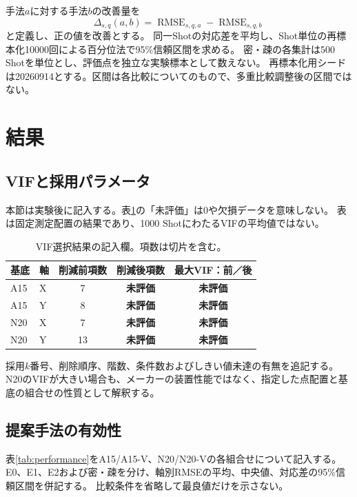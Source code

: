 \documentclass[11pt,a4paper]{ltjsarticle}
\newcommand{\RMSE}{\operatorname{RMSE}}
\newcommand{\todo}{\textbf{未評価}}
\begin{document}
手法$a$に対する手法$b$の改善量を
\begin{equation}
 \Delta_{s,q}(a,b)=\RMSE_{s,q,a}-\RMSE_{s,q,b}
 \label{eq:paired}
\end{equation}
と定義し、正の値を改善とする。
同一Shotの対応差を平均し、Shot単位の再標本化10000回による百分位法で95\%信頼区間を求める。
密・疎の各集計は500 Shotを単位とし、評価点を独立な実験標本として数えない。
再標本化用シードは20260914とする。区間は各比較についてのもので、多重比較調整後の区間ではない。

\section{結果}
\subsection{VIFと採用パラメータ}
本節は実験後に記入する。表\ref{tab:vif-results}の「未評価」は0や欠損データを意味しない。
表は固定測定配置の結果であり、1000 ShotにわたるVIFの平均値ではない。

\begin{table}[htbp]
\centering
\caption{VIF選択結果の記入欄。項数は切片を含む。}
\label{tab:vif-results}
\small
\begin{tabular}{llccc}
\toprule
基底 & 軸 & 削減前項数 & 削減後項数 & 最大VIF：前／後\\
\midrule
A15 & X & 7 & \todo & \todo\\
A15 & Y & 8 & \todo & \todo\\
N20 & X & 7 & \todo & \todo\\
N20 & Y & 13 & \todo & \todo\\
\bottomrule
\end{tabular}
\end{table}
採用$k$番号、削除順序、階数、条件数およびしきい値未達の有無を追記する。
N20のVIFが大きい場合も、メーカーの装置性能ではなく、指定した点配置と基底の組合せの性質として解釈する。

\subsection{提案手法の有効性}
表\ref{tab:performance}をA15/A15-V、N20/N20-Vの各組合せについて記入する。
E0、E1、E2および密・疎を分け、軸別RMSEの平均、中央値、対応差の95\%信頼区間を併記する。
比較条件を省略して最良値だけを示さない。
\end{document}
